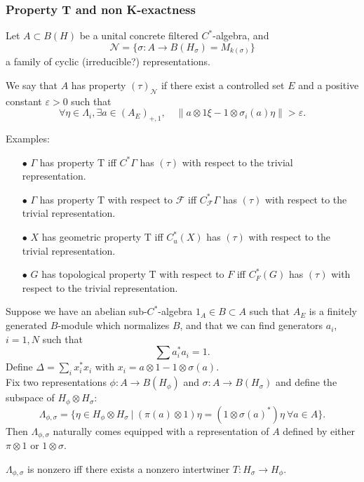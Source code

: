 \subsubsection*{Property T and non K-exactness}%

Let $A \subset B(H)$ be a unital concrete filtered $C^*$-algebra, and 
\[\mathcal N = \{\sigma : A \rightarrow B(H_\sigma) = M_{k(\sigma)}\}\]
a family of cyclic (irreducible?) representations.
\begin{definition}
We say that $A$ has property $(\tau )_{\mathcal N}$ if there exist a controlled set $E$ and a positive constant $\varepsilon>0$ such that 
\[\forall \eta \in \Lambda_{i}, \exists a\in (A_E)_{+,1}, \quad \| a \otimes 1 \xi - 1 \otimes \sigma_i(a) \eta  \| > \varepsilon . \]
\end{definition}

Examples: 
\begin{itemize}
\item[$\bullet$] $\Gamma$ has property T iff $C^*\Gamma$ has $(\tau)$ with respect to the trivial representation.
\item[$\bullet$] $\Gamma$ has property T with respect to $\mathcal F$ iff $C_{\mathcal F}^*\Gamma$ has $(\tau)$ with respect to the trivial representation.
\item[$\bullet$] $X$ has geometric property T iff $C^*_u(X)$ has $(\tau)$ with respect to the trivial representation.
\item[$\bullet$] $G$ has topological property T with respect to $F$ iff $C^*_F(G)$ has $(\tau)$ with respect to the trivial representation.
\end{itemize}

Suppose we have an abelian sub-$C^*$-algebra $1_A \in B\subset A$ such that $A_E$ is a finitely generated $B$-module which normalizes $B$, and that we can find generators $a_i$, $i = 1,N$ such that
\[\sum a_i^* a_i = 1.\]
Define $\Delta = \sum_i x_i^* x_i $ with $x_i =  a \otimes 1 - 1 \otimes \sigma(a)$.\\

Fix two representations $\phi : A \rightarrow B(H_\phi)$ and $\sigma : A \rightarrow B(H_\sigma)$ and define the subspace of $H_\phi \otimes H_\sigma $:
\[\Lambda_{\phi,\sigma} = \{\eta \in H_\phi \otimes H_\sigma \ | \ (\pi(a)\otimes 1)\eta  = (1\otimes \sigma(a)^*) \eta \ \forall a\in A\}.\]
Then $\Lambda_{\phi,\sigma}$ naturally comes equipped with a representation of $A$ defined by either $\pi\otimes 1$ or $1\otimes \sigma$. 
\begin{lem}
$\Lambda_{\phi,\sigma}$ is nonzero iff there exists a nonzero intertwiner $T: H_\sigma \rightarrow H_\phi$.
\end{lem}

